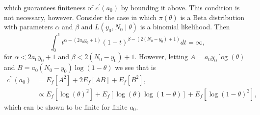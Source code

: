 \documentclass[a4paper, notitlepage, 11pt]{article}
\begin{document}
which guarantees finiteness of $c^\prime(a_0)$ by bounding it above.
This condition is not necessary, however.
Consider the case in which $\pi(\theta)$ is a Beta distribution with parameters $\alpha$ and $\beta$ and $L( y_0, N_0  \mid \theta)$ is a binomial likelihood.
Then 
\[ \int_0^1 t^{\alpha - (2 a_0 y_0 + 1)} (1-t)^{\beta - (2(N_0-y_0) + 1)} dt = \infty,\]
for $\alpha < 2 a_0 y_0 + 1$ and $\beta < 2(N_0-y_0) + 1$.
However, letting $A = a_0y_0\log(\theta)$ and $B = a_0(N_0-y_0)\log(1-\theta)$ we see that is
\begin{align*}
c^{\prime\prime}(a_0) &= E_f[A^2] + 2E_f[AB] + E_f[B^2], \\
  &\propto E_f[\log(\theta)^2] + E_f[\log(\theta)\log(1-\theta)] + E_f[\log(1-\theta)^2],
\end{align*}
which can be shown to be finite for finite $a_0$.
\end{document}
